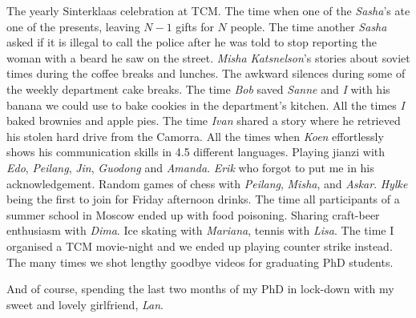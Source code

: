 The yearly Sinterklaas celebration at TCM. The time when one of the \emph{Sasha}'s ate one of the presents, leaving $N-1$ gifts for $N$ people. The time another \emph{Sasha} asked if it is illegal to call the police after he was told to stop reporting the woman with a beard he saw on the street. \emph{Misha Katsnelson}'s stories about soviet times during the coffee breaks and lunches. The awkward silences during some of the weekly department cake breaks. The time \emph{Bob} saved \emph{Sanne} and \emph{I} with his banana we could use to bake cookies in the department's kitchen. All the times \emph{I} baked brownies and apple pies. The time \emph{Ivan} shared a story where he retrieved his stolen hard drive from the Camorra. All the times when \emph{Koen} effortlessly shows his communication skills in 4.5 different languages. Playing jianzi with \emph{Edo}, \emph{Peilang}, \emph{Jin}, \emph{Guodong} and \emph{Amanda}. \emph{Erik} who forgot to put me in his acknowledgement. Random games of chess with \emph{Peilang}, \emph{Misha}, and \emph{Askar}. \emph{Hylke} being the first to join for Friday afternoon drinks. The time all participants of a summer school in Moscow ended up with food poisoning. Sharing craft-beer enthusiasm with \emph{Dima}. Ice skating with \emph{Mariana}, tennis with \emph{Lisa}. 
The time I organised a TCM movie-night and we ended up playing counter strike instead. The many times we shot lengthy goodbye videos for graduating PhD students. 

And of course, spending the last two months of my PhD in lock-down with my sweet and lovely girlfriend, \emph{Lan}.
